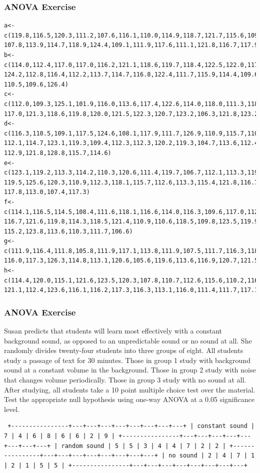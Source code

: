 \documentclass[xcolor=dvipsnames]{beamer} \usepackage{teachbeamer}
\begin{document}
\begin{frame}[fragile]
  \frametitle{ANOVA Exercise}
  \begin{footnotesize}
\begin{verbatim}
a<-c(119.8,116.5,120.3,111.2,107.6,116.1,110.0,114.9,118.7,121.7,115.6,109.4,
107.8,113.9,114.7,118.9,124.4,109.1,111.9,117.6,111.1,121.8,116.7,117.9,117.9)
b<-c(114.0,112.4,117.0,117.0,116.2,121.1,118.6,119.7,118.4,122.5,122.0,117.8,
124.2,112.8,116.4,112.2,113.7,114.7,116.8,122.4,111.7,115.9,114.4,109.6,123.2,
110.5,109.6,126.4)
c<-c(112.0,109.3,125.1,101.9,116.0,113.6,117.4,122.6,114.0,118.0,111.3,118.4,
117.0,121.3,118.6,119.8,120.0,121.5,122.3,120.7,123.2,106.3,121.8,123.2)
d<-c(116.3,110.5,109.1,117.5,124.6,108.1,117.9,111.7,126.9,110.9,115.7,110.8,
112.1,114.7,123.1,119.3,109.4,112.3,112.3,120.2,119.3,104.7,113.6,112.4,115.2,
112.9,121.8,128.8,115.7,114.6)
e<-c(123.1,119.2,113.3,114.2,110.3,120.6,111.4,119.7,106.7,112.1,113.3,119.3,
119.5,125.6,120.3,110.9,112.3,118.1,115.7,112.6,113.3,115.4,121.8,116.7,109.1,
117.8,113.0,107.4,117.3)
f<-c(114.1,116.5,114.5,108.4,111.6,118.1,116.6,114.0,116.3,109.6,117.0,112.0,
116.7,121.6,119.8,114.3,118.5,121.4,110.9,110.6,118.5,109.8,123.5,119.9,114.1,
115.2,123.8,113.6,110.3,111.7,106.6)
g<-c(111.9,116.4,111.8,105.8,111.9,117.1,113.8,111.9,107.5,111.7,116.3,118.4,
116.0,117.3,126.3,114.8,113.1,120.6,105.6,119.6,113.6,116.9,120.7,121.5,117.1,117.4)
h<-c(114.4,120.0,115.1,121.6,123.5,120.3,107.8,110.7,112.6,115.6,110.2,116.3,
121.1,112.4,123.6,116.1,116.2,117.3,116.3,113.1,116.0,111.4,111.7,117.1,116.2,113.9)
\end{verbatim}
  \end{footnotesize}
\end{frame}

\begin{frame}[fragile]
  \frametitle{ANOVA Exercise} Susan predicts that students will learn most effectively with a constant background sound, as opposed to an unpredictable sound or no sound at all. She randomly divides twenty-four students into three groups of eight. All students study a passage of text for 30 minutes. Those in group 1 study with background sound at a constant volume in the background. Those in group 2 study with noise that changes volume periodically. Those in group 3 study with no sound at all. After studying, all students take a 10 point multiple choice test over the material. Test the appropriate null hypothesis using one-way ANOVA at a 0.05 significance level.

\begin{footnotesize}
\begin{verbatim} +----------------+---+---+---+---+---+---+---+---+ | constant sound | 7 | 4 | 6 | 8 | 6 | 6 | 2 | 9 | +----------------+---+---+---+---+---+---+---+---+ | random sound | 5 | 5 | 3 | 4 | 4 | 7 | 2 | 2 | +----------------+---+---+---+---+---+---+---+---+ | no sound | 2 | 4 | 7 | 1 | 2 | 1 | 5 | 5 | +----------------+---+---+---+---+---+---+---+---+
\end{verbatim}
\end{footnotesize}
\end{frame}
\end{document}
